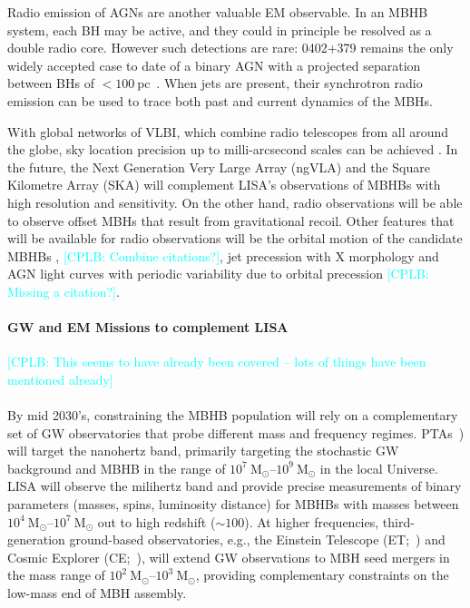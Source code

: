\documentclass[a4paper,12pt]{article}
\newcommand{\cplb}[1]{\textcolor{cyan}{[CPLB: #1]}}
\begin{document}
Radio emission of AGNs are another valuable EM observable. In an MBHB system, each BH may be active, and they could in principle be resolved as a double radio core. However such detections are rare: 0402+379 remains the only widely accepted case to date of a binary AGN with a projected separation between BHs of $<100~\mathrm{pc}$~\cite{rodriguez2006compact,johnstone2026radio}. When jets are present, their synchrotron radio emission can be used to trace both past and current dynamics of the MBHs.

With global networks of VLBI, which combine radio telescopes from all around the globe, sky location precision up to milli-arcsecond scales can be achieved \cite{venturi2020vlbi20}. In the future, the Next Generation Very Large Array (ngVLA) and the Square Kilometre Array (SKA) will complement LISA's observations of MBHBs with high resolution and sensitivity. On the other hand, radio observations will be able to observe offset MBHs that result from gravitational recoil. Other features that will be available for radio observations will be the orbital motion of the candidate MBHBs \cite{bansal2017constraining}, \cite{burke2018next} \cplb{Combine citations?}, jet precession with X morphology \cite{horton2020markov} and AGN light curves with periodic variability due to orbital precession \cplb{Missing a citation?}.

\paragraph{GW and EM Missions to complement LISA}

\cplb{This seems to have already been covered -- lots of things have been mentioned already}
\paragraph{}
By mid 2030's, constraining the MBHB population will rely on a complementary set of GW observatories that probe different mass and frequency regimes. PTAs~\cite{burke2019astrophysics}) will target the nanohertz band, primarily targeting the stochastic GW background and MBHB in the range of  $10^{7}~\mathrm{M}_{\odot}$--$10^{9} ~\mathrm{M}_{\odot}$ in the local Universe. LISA will observe the milihertz band and provide precise measurements of binary parameters (masses, spins, luminosity distance) for MBHBs with masses between $10^{4}~\mathrm{M}_{\odot}$--$10^{7}~\mathrm{M}_{\odot}$ out to high redshift ($\sim100$). At higher frequencies, third-generation ground-based observatories, e.g., the Einstein Telescope (ET;~\cite{gair2011exploring}) and Cosmic Explorer (CE;~\cite{hall2022cosmic}), will extend GW observations to MBH seed mergers in the mass range of $10^{2}~\mathrm{M}_{\odot}$--$10^{3}~\mathrm{M}_{\odot}$, providing complementary constraints on the low-mass end of MBH assembly.
\end{document}
